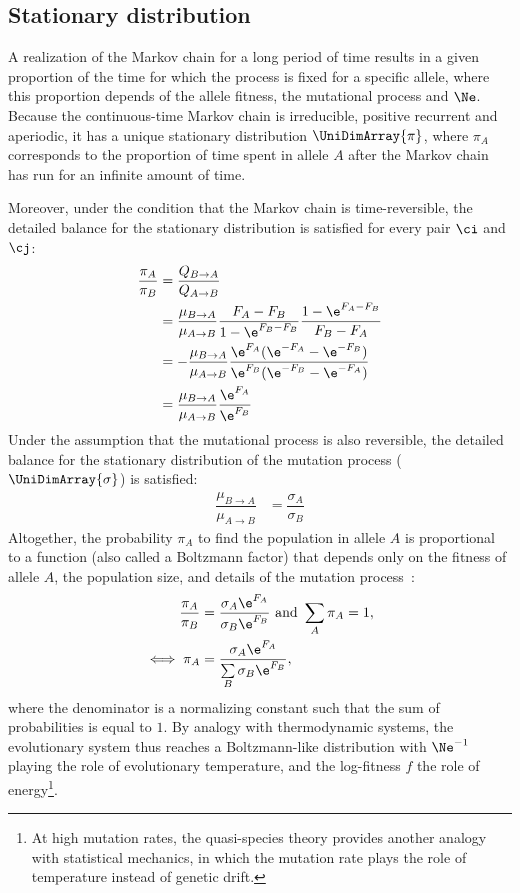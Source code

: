 \subsection{Stationary distribution}

A realization of the Markov chain for a long period of time results in a given proportion of the time for which the process is fixed for a specific allele, where this proportion depends of the allele fitness, the mutational process and $\Ne$.
Because the continuous-time Markov chain is irreducible, positive recurrent and aperiodic, it has a unique stationary distribution $\UniDimArray{\pi}$, where $\pi_{A}$ corresponds to the proportion of time spent in allele $A$ after the Markov chain has run for an infinite amount of time.

Moreover, under the condition that the Markov chain is time-reversible, the detailed balance for the stationary distribution is satisfied for every pair $\ci$ and $\cj$:
\begin{align}
    \dfrac{\pi_{A}}{\pi_{B}} & = \dfrac{Q_{B \to A}}{Q_{A \to B}} \\
    & = \dfrac{\mu_{B \to A}}{\mu_{A \to B}}  \dfrac{F_{A}-F_{B}}{ 1 - \e^{F_{B}-F_{B}}}  \dfrac{1 - \e^{F_{A} - F_{B}} }{F_{B} - F_{A}}\\
    & = - \dfrac{\mu_{B \to A}}{\mu_{A \to B}}  \dfrac{ \e^{F_{A}}(\e^{-F_{A}} - \e^{- F_{B}}) }{ \e^{F_{B}}(\e^{-F_{B}} - \e^{- F_{A}})}  \\
    & = \dfrac{\mu_{B \to A}}{\mu_{A \to B}} \dfrac{\e^{F_{A}}}{\e^{F_{B}}} \\
\end{align}
Under the assumption that the mutational process is also reversible, the detailed balance for the stationary distribution of the mutation process ($\UniDimArray{\sigma}$) is satisfied:
\begin{align}
    \dfrac{\mu_{B \to A}}{\mu_{A \to B}} & = \dfrac{\sigma_{A}}{\sigma_{B}}
\end{align}
Altogether, the probability $\pi_{A}$ to find the population in allele $A$ is proportional to a function (also called a Boltzmann factor) that depends only on the fitness of allele $A$, the population size, and details of the mutation process~\citep{Sella2005,Mustonen2005}:
\begin{align}
    \dfrac{\pi_{A}}{\pi_{B}} & = \dfrac{\sigma_{A}\e^{F_{A}}}{\sigma_{B}\e^{F_{B}}} \text{ and } \sum\limits_{A}\pi_{A} = 1, \\
    \iff \pi_{A} & = \dfrac{\sigma_{A}\e^{F_{A}}}{\sum\limits_{B} \sigma_{B}\e^{F_{B}} }, \label{eq:equilibrium-mut-sel}
\end{align}
where the denominator is a normalizing constant such that the sum of probabilities is equal to $1$.
By analogy with thermodynamic systems, the evolutionary system thus reaches a Boltzmann-like distribution with $\Ne^{-1}$ playing the role of evolutionary temperature, and the log-fitness $f$ the role of energy\footnote{At high mutation rates, the quasi-species theory provides another analogy with statistical mechanics, in which the mutation rate plays the role of temperature instead of genetic drift.}.

